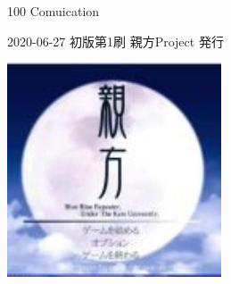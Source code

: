 \clearpage{\thispagestyle{empty}}
\begin{center}

\vspace{120pt}

\begin{sffamily}
\Large
100 Comuication
\normalsize
\end{sffamily}
\vspace{320pt}

\begin{sffamily}
2020-06-27
\hspace{5pt}
初版第1刷
\hspace{5pt}
親方Project
\hspace{5pt}
発行
\end{sffamily}

\includegraphics[width=0.3\linewidth]{images/oyakata.png}

\end{center}
